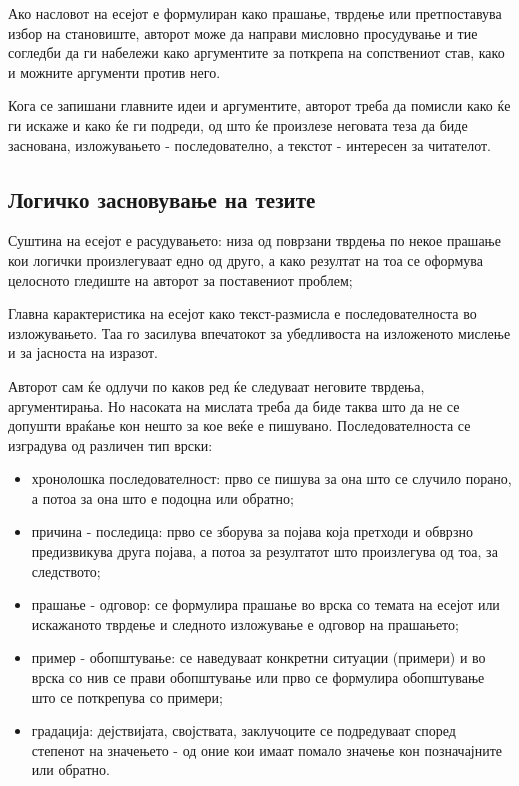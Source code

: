 \documentclass[12pt,a4paper]{article}
\begin{document}
Ако насловот на есејот е формулиран како прашање, твр­дење или претпоставува
избор на становиште, авторот мо­же да направи мисловно просудување и тие
согледби да ги набележи како аргументите за поткрепа на сопствениот став, како и
можните аргументи против него.

Кога се запишани главните идеи и аргументите, авторот треба да помисли
    како ќе ги искаже и како ќе ги подреди, од што ќе произлезе неговата теза да
    биде заснована, из­ложувањето - последователно, а текстот - интересен за
    читателот.

\subsection{Логичко засновување на тезите}

Суштина на есејот е расудувањето: низа од поврзани тврде­ња по некое прашање кои
логички произлегуваат едно од друго, а како резултат на тоа се оформува
целосното гле­диште на авторот за поставениот проблем;
    
Главна карактеристика на есејот како текст-размисла е последователноста во
изложувањето. Таа го засилува впечатокот за убедливоста на изложеното мислење и
за јасноста на изразот.
    
Авторот сам ќе одлучи по каков ред ќе следуваат неговите тврдења, аргументирања.
Но насоката на мислата треба да биде таква што да не се допушти враќање кон
нешто за кое веќе е пишувано. Пос­ледователноста се изградува од различен тип
врски:
\begin{itemize}
  \item хронолошка последователност: прво се пишува за она што се случило
  порано, а потоа за она што е подоцна или обратно;
  \item причина - последица: прво се зборува за појава која претходи и обврзно предизвикува друга појава, а
потоа за резултатот што произлегува од тоа, за следството;
  \item прашање - одговор: се формулира прашање во врска со темата на есејот или
  искажаното тврдење и следно­то изложување е одговор на прашањето;
  \item пример - обопштување: се наведуваат конкретни си­туации (примери) и во
  врска со нив се прави обопштување или прво се формулира обопштување што се поткрепу­ва со примери;
  \item градација: дејствијата, својствата, заклучоците се под­редуваат според степенот на
значењето - од оние кои имаат помало значење кон позначајните или обратно.
\end{itemize}
\end{document}
